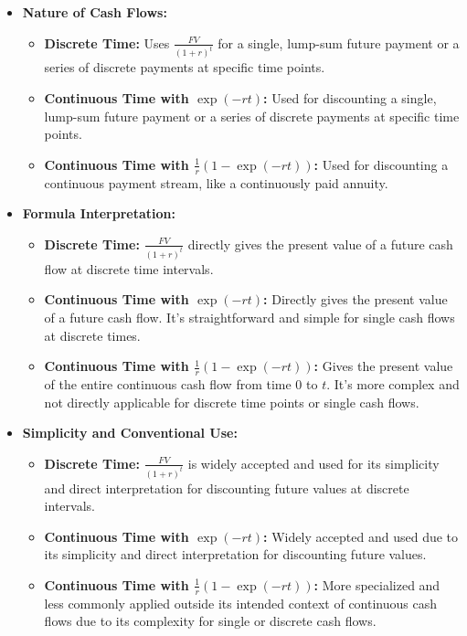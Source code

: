 \documentclass{article}
\begin{document}
\begin{itemize}
  \item \textbf{Nature of Cash Flows:}
  \begin{itemize}
    \item \textbf{Discrete Time:} Uses \( \frac{FV}{(1 + r)^t} \) for a single, lump-sum future payment or a series of discrete payments at specific time points.
    \item \textbf{Continuous Time with \( \exp(-rt) \):} Used for discounting a single, lump-sum future payment or a series of discrete payments at specific time points.
    \item \textbf{Continuous Time with \( \frac{1}{r}(1 - \exp(-rt)) \):} Used for discounting a continuous payment stream, like a continuously paid annuity.
  \end{itemize}

  \item \textbf{Formula Interpretation:}
  \begin{itemize}
    \item \textbf{Discrete Time:} \( \frac{FV}{(1 + r)^t} \) directly gives the present value of a future cash flow at discrete time intervals.
    \item \textbf{Continuous Time with \( \exp(-rt) \):} Directly gives the present value of a future cash flow. It's straightforward and simple for single cash flows at discrete times.
    \item \textbf{Continuous Time with \( \frac{1}{r}(1 - \exp(-rt)) \):} Gives the present value of the entire continuous cash flow from time 0 to \( t \). It's more complex and not directly applicable for discrete time points or single cash flows.
  \end{itemize}

  \item \textbf{Simplicity and Conventional Use:}
  \begin{itemize}
    \item \textbf{Discrete Time:} \( \frac{FV}{(1 + r)^t} \) is widely accepted and used for its simplicity and direct interpretation for discounting future values at discrete intervals.
    \item \textbf{Continuous Time with \( \exp(-rt) \):} Widely accepted and used due to its simplicity and direct interpretation for discounting future values.
    \item \textbf{Continuous Time with \( \frac{1}{r}(1 - \exp(-rt)) \):} More specialized and less commonly applied outside its intended context of continuous cash flows due to its complexity for single or discrete cash flows.
  \end{itemize}
\end{itemize}
\end{document}
